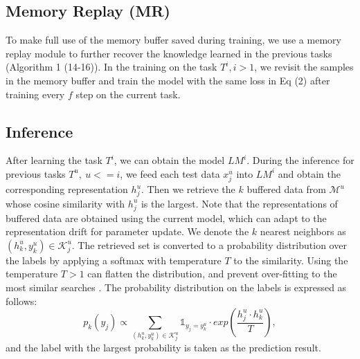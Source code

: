 \subsection{Memory Replay (MR)}
To make full use of the memory buffer saved during training, we use a memory replay module \cite{de2019episodic} to further recover the knowledge learned in the previous tasks (Algorithm 1 (14-16)). In the training on the task  $T^i, i>1$, we revisit the samples in the memory buffer and train the model with the same loss in Eq (2) after training every $f$ step on the current task.


\subsection{Inference}
 After learning the task $T^i$, we can obtain the model  $LM^i$. During the inference for previous tasks $T^u,\ u<=i$, we feed each test data $x^u_j$ into $LM^i$ and obtain the corresponding representation ${h}^u_j$. Then  we retrieve the $k$ buffered data from  $\mathcal{M}^u$ whose cosine similarity with ${h}^u_j$ is the largest. Note that the representations of buffered data are obtained using the current model, which can adapt to the representation drift  for parameter update.  We denote the $k$ nearest neighbors as ${({h}^u_k,y^u_k)\in \mathcal{K}^u_j}$. The retrieved set is converted to a probability distribution over the labels by applying a softmax with temperature $T$ to the similarity. Using the temperature $T>1$ can flatten the distribution, and prevent over-fitting to the most similar searches \cite{khandelwal2020nearest}. The probability distribution on the labels is expressed as follows:
\begin{equation}
p_{k}(y_j) \propto \sum_{{(h^u_k,y^u_k)\in \mathcal{K}^u_j}} \mathds{1}_{y_j=y^u_k} \cdot exp(\frac{{h}_j^u \cdot {h}_k^u}{T} ),
\end{equation}
and the label with the largest probability is taken as the prediction result.







